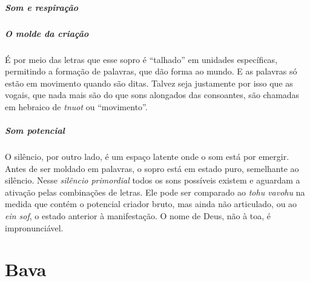 \paragraph{Som e respiração} 

\paragraph{O molde da criação} É por meio das letras que esse sopro é ``talhado'' em unidades específicas, permitindo a formação de palavras, que dão forma ao mundo. E as palavras só estão em movimento quando são ditas. Talvez seja justamente por isso que as vogais, que nada mais são do que sons alongados das consoantes, são chamadas em hebraico de \textit{tnuot} ou ``movimento''.

\paragraph{Som potencial} O silêncio, por outro lado, é um espaço latente onde o som está por emergir. Antes de ser moldado em palavras, o sopro está em estado puro, semelhante ao silêncio. Nesse \textit{silêncio primordial} todos os sons possíveis existem e aguardam a ativação pelas combinações de letras. Ele pode ser comparado ao \textit{tohu vavohu} na medida que contém o potencial criador bruto, mas ainda não articulado, ou ao \textit{ein sof}, o estado anterior à manifestação. O nome de Deus, não à toa, é impronunciável.

\chapter*{Bava 
\smallskip{}}

\begin{center}
{\huge{}}\\\medskip{\footnotesize\formularlight{
\lipsum[2]
}}
\end{center}

